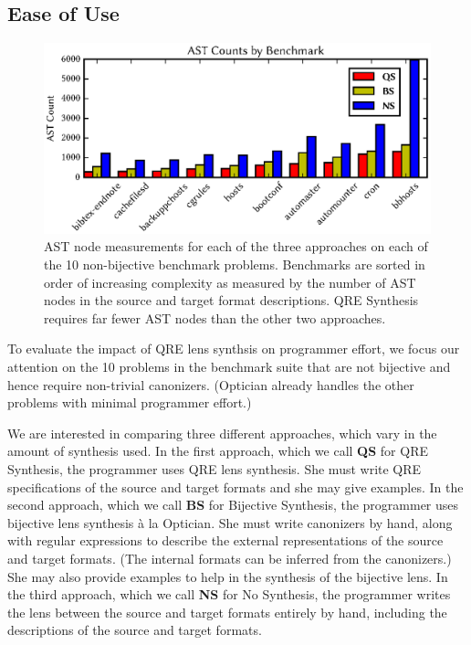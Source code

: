 \documentclass[acmsmall,screen]{acmart}
\newcommand{\QRESize}{\textbf{QS}}
\newcommand{\canonizeAndSpecSize}{\textbf{BS}}
\newcommand{\LensAndSpecSize}{\textbf{NS}}
\begin{document}
\subsection{Ease of Use}

\begin{figure}[t]
\includegraphics{generated-graphs/asts.eps}
\caption{AST node measurements for each of the three approaches
on each of the 10 non-bijective benchmark problems.
Benchmarks are sorted in order of increasing complexity as measured by
the number of AST nodes in the source and target format descriptions. 
QRE Synthesis requires far fewer AST nodes than the other
two approaches.}
\label{fig:asts}
\end{figure}

To evaluate the impact of QRE lens synthsis on programmer effort,
we focus our attention on the 10 problems in the benchmark suite that
are not bijective and hence require non-trivial canonizers. 
(Optician already handles the other problems with minimal programmer
effort.)

We are interested in comparing three different approaches, which vary
in the amount of synthesis used. 
In the first approach, which we call \QRESize{} for QRE Synthesis, the programmer uses
QRE lens synthesis.  She must write QRE specifications of the source and
target formats and she may give examples.
In the second approach, which we call \canonizeAndSpecSize{} for
Bijective Synthesis, the
programmer uses bijective lens synthesis \`a la Optician.
She must write canonizers by hand, along with 
regular expressions to describe the external
representations of the source and target formats. (The internal
formats can be inferred from the canonizers.) She may also
provide examples to help in the synthesis of the bijective lens.
In the third approach, which we call \LensAndSpecSize{} for No Synthesis, the
programmer writes the lens between the source and target formats
entirely by hand, including the descriptions of the source and target
formats.
\end{document}
